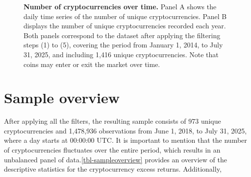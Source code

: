 \documentclass[
  12pt,
  a4paper,
  openany]{scrbook}
\begin{document}
\begin{figure}[h]


\caption[Number of cryptocurrencies over
time]{\label{fig-numcoins}\textbf{Number of cryptocurrencies over time.}
Panel A shows the daily time series of the number of unique
cryptocurrencies. Panel B displays the number of unique cryptocurrencies
recorded each year. Both panels correspond to the dataset after applying
the filtering steps (1) to (5), covering the period from January 1,
2014, to July 31, 2025, and including 1,416 unique cryptocurrencies.
Note that coins may enter or exit the market over time.}

\end{figure}%

\section{Sample overview}\label{sample-overview}

After applying all the filters, the resulting sample consists of 973
unique cryptocurrencies and 1,478,936 observations from June 1, 2018, to
July 31, 2025, where a day starts at 00:00:00 UTC. It is important to
mention that the number of cryptocurrencies fluctuates over the entire
period, which results in an unbalanced panel of
data.\ref{tbl-sampleoverview} provides an overview of the descriptive
statistics for the cryptocurrency excess returns. Additionally,
\end{document}
